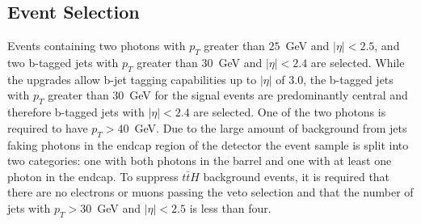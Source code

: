 
\subsection{Event Selection}
\label{sec:eventselection}
 
Events containing two photons with $p_{T}$ greater than $25$~GeV
and $|\eta|<2.5$, and two b-tagged jets with $p_{T}$ greater than $30$~GeV and $|\eta|<2.4$ are selected. While the \phasetwo upgrades allow b-jet tagging capabilities up to $|\eta|$ of $3.0$, the b-tagged jets with $p_{T}$ greater than $30$~GeV for the signal events are predominantly central and therefore b-tagged jets with $|\eta|<2.4$ are selected. One of the two photons is required to have $p_{T} > 40$~GeV. Due to the large amount of background from jets faking photons in the endcap region of the detector the event sample is split into two categories: one with both photons in the barrel and one with at least one photon in the endcap. To suppress $t\bar{t}H$ background events, it is required that there are no electrons or muons passing the veto selection and that  the number of jets with $p_{T}>30$~GeV and $|\eta|<2.5$ is less than four. 

